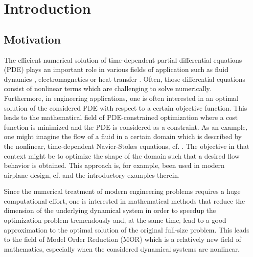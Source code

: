 \chapter{Introduction}
\section{Motivation}
The efficient numerical solution of time-dependent partial differential equations (PDE) plays an important role in various fields of application such as fluid dynamics \cite{CM79,W01}, electromagnetics \cite{P98,T05} or heat transfer \cite{J03}. Often, those differential equations consist of nonlinear terms which are challenging to solve numerically. Furthermore, in engineering applications, one is often interested in an optimal solution of the considered PDE with respect to a certain objective function. This leads to the mathematical field of PDE-constrained optimization where a cost function is minimized and the PDE is considered as a constraint. As an example, one might imagine the flow of a fluid in a certain domain which is described by the nonlinear, time-dependent Navier-Stokes equations, cf. \cite{C12}. The objective in that context might be to optimize the shape of the domain such that a desired flow behavior is obtained. This approach is, for example, been used in modern airplane design, cf. \cite{BC03,HM03,MP01} and the introductory examples therein.

Since the numerical treatment of modern engineering problems requires a huge computational effort, one is interested in mathematical methods that reduce the dimension of the underlying dynamical system in order to speedup the optimization problem tremendously and, at the same time, lead to a good approximation to the optimal solution of the original full-size problem. This leads to the field of Model Order Reduction (MOR) which is a relatively new field of mathematics, especially when the considered dynamical systems are nonlinear.
